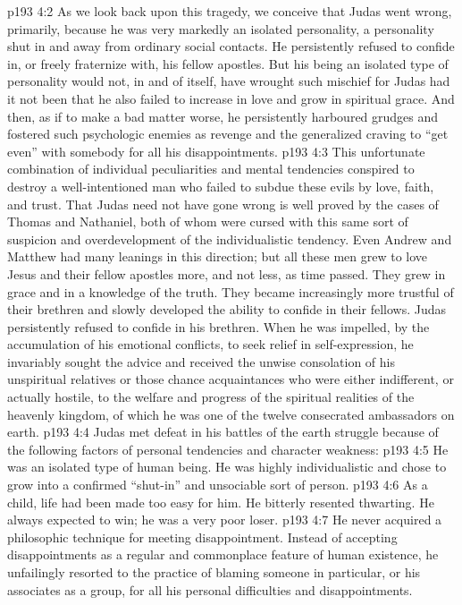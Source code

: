 \vs p193 4:2 As we look back upon this tragedy, we conceive that Judas went wrong, primarily, because he was very markedly an isolated personality, a personality shut in and away from ordinary social contacts. He persistently refused to confide in, or freely fraternize with, his fellow apostles. But his being an isolated type of personality would not, in and of itself, have wrought such mischief for Judas had it not been that he also failed to increase in love and grow in spiritual grace. And then, as if to make a bad matter worse, he persistently harboured grudges and fostered such psychologic enemies as revenge and the generalized craving to “get even” with somebody for all his disappointments.
\vs p193 4:3 This unfortunate combination of individual peculiarities and mental tendencies conspired to destroy a well\hyp{}intentioned man who failed to subdue these evils by love, faith, and trust. That Judas need not have gone wrong is well proved by the cases of Thomas and Nathaniel, both of whom were cursed with this same sort of suspicion and overdevelopment of the individualistic tendency. Even Andrew and Matthew had many leanings in this direction; but all these men grew to love Jesus and their fellow apostles more, and not less, as time passed. They grew in grace and in a knowledge of the truth. They became increasingly more trustful of their brethren and slowly developed the ability to confide in their fellows. Judas persistently refused to confide in his brethren. When he was impelled, by the accumulation of his emotional conflicts, to seek relief in self\hyp{}expression, he invariably sought the advice and received the unwise consolation of his unspiritual relatives or those chance acquaintances who were either indifferent, or actually hostile, to the welfare and progress of the spiritual realities of the heavenly kingdom, of which he was one of the twelve consecrated ambassadors on earth.
\vs p193 4:4 Judas met defeat in his battles of the earth struggle because of the following factors of personal tendencies and character weakness:
\vs p193 4:5 \bibnobreakspace He was an isolated type of human being. He was highly individualistic and chose to grow into a confirmed “shut\hyp{}in” and unsociable sort of person.
\vs p193 4:6 \bibnobreakspace As a child, life had been made too easy for him. He bitterly resented thwarting. He always expected to win; he was a very poor loser.
\vs p193 4:7 \bibnobreakspace He never acquired a philosophic technique for meeting disappointment. Instead of accepting disappointments as a regular and commonplace feature of human existence, he unfailingly resorted to the practice of blaming someone in particular, or his associates as a group, for all his personal difficulties and disappointments.
